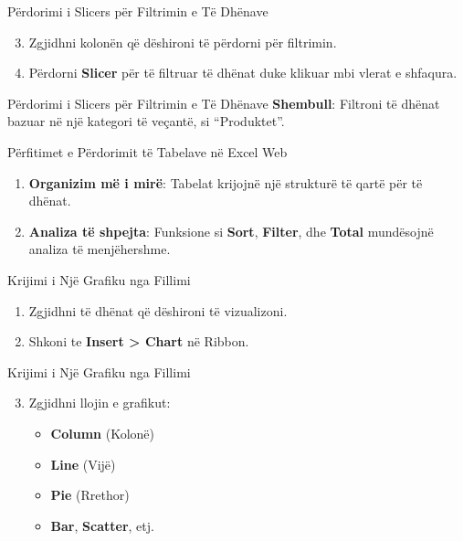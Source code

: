 \documentclass[
  ignorenonframetext,
]{beamer}
\begin{document}
\begin{frame}{Përdorimi i Slicers për Filtrimin e Të Dhënave}
\label{puxebrdorimi-i-slicers-puxebr-filtrimin-e-tuxeb-dhuxebnave-1}
\begin{enumerate}
\setcounter{enumi}{2}
\item
  Zgjidhni kolonën që dëshironi të përdorni për filtrimin.
\item
  Përdorni \textbf{Slicer} për të filtruar të dhënat duke klikuar mbi
  vlerat e shfaqura.
\end{enumerate}
\end{frame}

\begin{frame}{Përdorimi i Slicers për Filtrimin e Të Dhënave}
\label{puxebrdorimi-i-slicers-puxebr-filtrimin-e-tuxeb-dhuxebnave-2}
\textbf{Shembull}: Filtroni të dhënat bazuar në një kategori të veçantë,
si ``Produktet''.
\end{frame}

\begin{frame}{Përfitimet e Përdorimit të Tabelave në Excel Web}
\label{puxebrfitimet-e-puxebrdorimit-tuxeb-tabelave-nuxeb-excel-web}
\begin{enumerate}
\item
  \textbf{Organizim më i mirë}: Tabelat krijojnë një strukturë të qartë
  për të dhënat.
\item
  \textbf{Analiza të shpejta}: Funksione si \textbf{Sort},
  \textbf{Filter}, dhe \textbf{Total} mundësojnë analiza të
  menjëhershme.
\end{enumerate}
\end{frame}

\begin{frame}{Krijimi i Një Grafiku nga Fillimi}
\label{krijimi-i-njuxeb-grafiku-nga-fillimi}
\begin{enumerate}
\item
  Zgjidhni të dhënat që dëshironi të vizualizoni.
\item
  Shkoni te \textbf{Insert \textgreater{} Chart} në Ribbon.
\end{enumerate}
\end{frame}

\begin{frame}{Krijimi i Një Grafiku nga Fillimi}
\label{krijimi-i-njuxeb-grafiku-nga-fillimi-1}
\begin{enumerate}
\setcounter{enumi}{2}
\item
  Zgjidhni llojin e grafikut:

  \begin{itemize}
  \item
    \textbf{Column} (Kolonë)
  \item
    \textbf{Line} (Vijë)
  \item
    \textbf{Pie} (Rrethor)
  \item
    \textbf{Bar}, \textbf{Scatter}, etj.
  \end{itemize}
\end{enumerate}
\end{frame}
\end{document}
